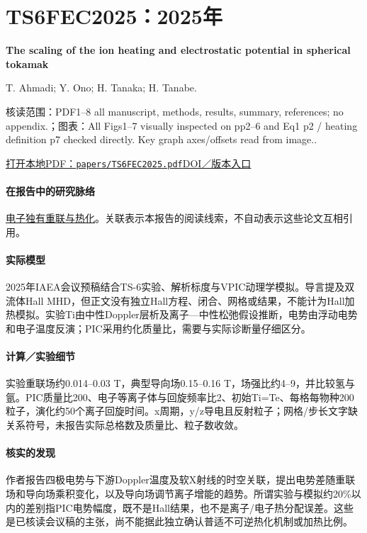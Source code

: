 \section{TS6FEC2025：2025年}\label{paper:TS6FEC2025}

\textbf{The scaling of the ion heating and electrostatic potential in spherical tokamak}\citep{TS6FEC2025}\

T. Ahmadi;  Y. Ono;  H. Tanaka;  H. Tanabe.

\textsf{核读范围：}PDF1–8 all manuscript,  methods,  results,  summary,  references;  no appendix.；\textsf{图表：}All Figs1–7 visually inspected on pp2–6 and Eq1 p2 / heating definition p7 checked directly. Key graph axes/offsets read from image..

\href{run:papers/TS6FEC2025.pdf}{打开本地PDF：\texttt{papers/TS6FEC2025.pdf}}\quad\href{https://conferences.iaea.org/event/392/papers/35991/}{DOI／版本入口}

\paragraph{在报告中的研究脉络}\hyperref[story:energy]{电子独有重联与热化}。关联表示本报告的阅读线索，不自动表示这些论文互相引用。

\paragraph{实际模型}2025年IAEA会议预稿结合TS-6实验、解析标度与VPIC动理学模拟。导言提及双流体Hall MHD，但正文没有独立Hall方程、闭合、网格或结果，不能计为Hall加热模拟。实验Ti由中性Doppler层析及离子—中性松弛假设推断，电势由浮动电势和电子温度反演；PIC采用约化质量比，需要与实际诊断量仔细区分。

\paragraph{计算／实验细节}实验重联场约0.014–0.03 T，典型导向场0.15–0.16 T，场强比约4–9，并比较氢与氩。PIC质量比200、电子等离子体与回旋频率比2、初始Ti=Te、每格每物种200粒子，演化约50个离子回旋时间。x周期，y/z导电且反射粒子；网格/步长文字缺关系符号，未报告实际总格数及质量比、粒子数收敛。

\paragraph{核实的发现}作者报告四极电势与下游Doppler温度及软X射线的时空关联，提出电势差随重联场和导向场乘积变化，以及导向场调节离子增能的趋势。所谓实验与模拟约20\%以内的差别指PIC电势幅度，既不是Hall结果，也不是离子/电子热分配误差。这些是已核读会议稿的主张，尚不能据此独立确认普适不可逆热化机制或加热比例。


